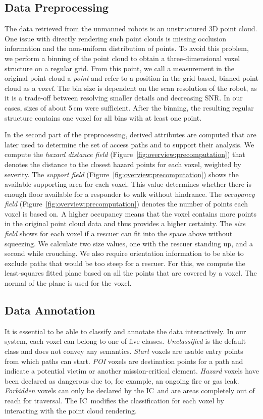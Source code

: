 \documentclass[conference,10pt,letter]{IEEEtran}
\def\IC{IC}
\begin{document}
\subsection{Data Preprocessing} \label{sec:overview:preprocessing}
The data retrieved from the unmanned robots is an unstructured 3D point cloud. One issue with directly rendering such point clouds is missing occlusion information and the non-uniform distribution of points. To avoid this problem, we perform a binning of the point cloud to obtain a three-dimensional voxel structure on a regular grid. From this point, we call a measurement in the original point cloud a \emph{point} and refer to a position in the grid-based, binned point cloud as a \emph{voxel}. The bin size is dependent on the scan resolution of the robot, as it is a trade-off between resolving smaller details and decreasing SNR. In our cases, sizes of about 5\,cm were sufficient. After the binning, the resulting regular structure contains one voxel for all bins with at least one point.

In the second part of the preprocessing, derived attributes are computed that are later used to determine the set of access paths and to support their analysis. We compute the \emph{hazard distance field} (Figure~\ref{fig:overview:precomputation}) that denotes the distance to the closest hazard points for each voxel, weighted by severity. The \emph{support field} (Figure~\ref{fig:overview:precomputation}) shows the available supporting area for each voxel. This value determines whether there is enough floor available for a responder to walk without hindrance. The \emph{occupancy field} (Figure~\ref{fig:overview:precomputation}) denotes the number of points each voxel is based on. A higher occupancy means that the voxel contains more points in the original point cloud data and thus provides a higher certainty. The \emph{size field} shows for each voxel if a rescuer can fit into the space above without squeezing. We calculate two size values, one with the rescuer standing up, and a second while crouching. We also require orientation information to be able to exclude paths that would be too steep for a rescuer. For this, we compute the least-squares fitted plane based on all the points that are covered by a voxel. The normal of the plane is used for the voxel.

\subsection{Data Annotation} \label{sec:overview:annotation}
It is essential to be able to classify and annotate the data interactively. In our system, each voxel can belong to one of five classes. \emph{Unclassified} is the default class and does not convey any semantics. \emph{Start} voxels are usable entry points from which paths can start. \emph{POI} voxels are destination points for a path and indicate a potential victim or another mission-critical element. \emph{Hazard} voxels have been declared as dangerous due to, for example, an ongoing fire or gas leak. \emph{Forbidden} voxels can only be declared by the \IC\ and are areas completely out of reach for traversal. The \IC\ modifies the classification for each voxel by interacting with the point cloud rendering.
\end{document}
